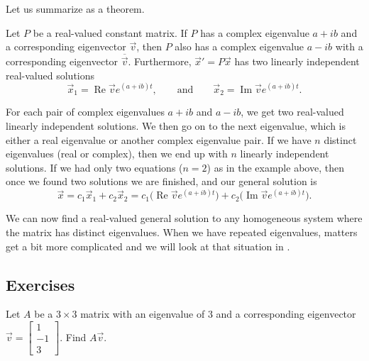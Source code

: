 \medskip

Let us summarize as a theorem.

\begin{theorem}
Let $P$ be a real-valued constant matrix.
If $P$ has a complex eigenvalue $a+ib$ and a corresponding eigenvector
$\vec{v}$, then $P$ also has a complex eigenvalue $a-ib$ with
a corresponding eigenvector $\overline{\vec{v}}$.
Furthermore,
${\vec{x}}' = P\vec{x}$ has
two linearly independent real-valued solutions
\begin{equation*}
\vec{x}_1 = \operatorname{Re} \vec{v} e^{(a+ib)t} ,
\qquad
\text{and}
\qquad
\vec{x}_2 = \operatorname{Im} \vec{v} e^{(a+ib)t} .
\end{equation*}
\end{theorem}

For each pair of complex eigenvalues $a+ib$ and $a-ib$,
we get two real-valued linearly
independent solutions.
We then go on to the next
eigenvalue, which is either a real eigenvalue or another complex eigenvalue
pair.  If we have $n$ distinct eigenvalues (real or complex), then we end up with $n$ linearly independent solutions.
If we had only two equations ($n=2$) as in the example above,
then once we found two solutions we are
finished, and our general solution is
\begin{equation*}
\vec{x} =
c_1 \vec{x}_1 + c_2 \vec{x}_2
= 
c_1 \bigl( \operatorname{Re} \vec{v} e^{(a+ib)t} \bigr) +
c_2 \bigl( \operatorname{Im} \vec{v} e^{(a+ib)t} \bigr)
.
\end{equation*}

We can now find a real-valued general solution to any homogeneous
system where the matrix has distinct eigenvalues.  When we have repeated
eigenvalues, matters get a bit more complicated and we will look at that
situation in .

\subsection{Exercises}

\begin{exercise}[easy]
Let $A$ be a $3 \times 3$ matrix with an eigenvalue of 3 and a
corresponding eigenvector $\vec{v} =
\left[ \begin{smallmatrix} 1 \\ -1 \\ 3 \end{smallmatrix} \right]$.
Find $A \vec{v}$.
\end{exercise}

